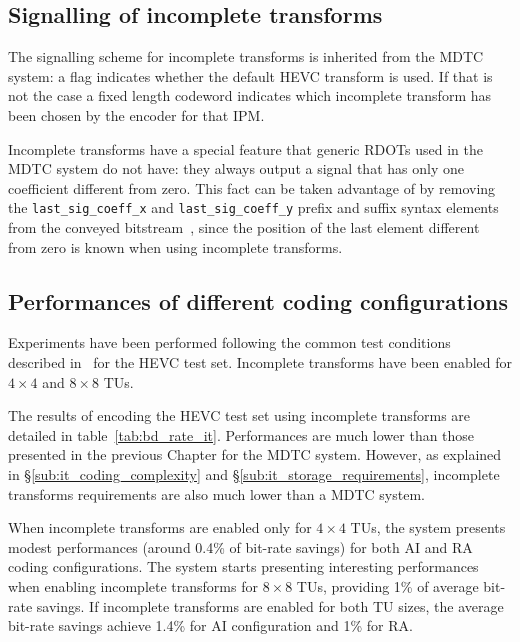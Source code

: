 \documentclass[11pt,a4paper,openright,twoside]{book}
\numberwithin{equation}{section} %
\numberwithin{figure}{section} %
\numberwithin{table}{section} %
\begin{document}
\subsection{Signalling of incomplete transforms}
\label{sub:it_signalling}

The signalling scheme for incomplete transforms is inherited from the
\ac{MDTC} system:
a flag indicates whether the default \ac{HEVC} transform is used.
If that is not the case a fixed length codeword indicates which incomplete
transform has been chosen by the encoder for that \ac{IPM}.

Incomplete transforms have a special feature that generic \acp{RDOT} used in
the \ac{MDTC} system do not have:
they always output a signal that has only one coefficient different from zero.
This fact can be taken advantage of by removing the
\texttt{last\_sig\_coeff\_x} and \texttt{last\_sig\_coeff\_y} prefix and
suffix syntax elements from the conveyed bitstream~\cite{JCTVC-G704}, since
the position of the last element different from zero is known when using
incomplete transforms.

\subsection{Performances of different coding configurations}
\label{sub:it_performances}

Experiments have been performed following the common test conditions described
in~\cite{bossen-12-common-test-conditions} for the \ac{HEVC} test set.
Incomplete transforms have been enabled for $4\times4$ and $8\times8$
\acp{TU}.

The results of encoding the \ac{HEVC} test set using incomplete transforms are
detailed in table~\ref{tab:bd_rate_it}.
Performances are much lower than those presented in the previous Chapter for
the \ac{MDTC} system.
However, as explained in \S\ref{sub:it_coding_complexity} and
\S\ref{sub:it_storage_requirements}, incomplete transforms requirements are
also much lower than a \ac{MDTC} system.

When incomplete transforms are enabled only for $4\times4$ \acp{TU}, the
system presents modest performances (around 0.4\% of bit-rate savings) for
both \ac{AI} and \ac{RA} coding configurations.
The system starts presenting interesting performances when enabling incomplete
transforms for $8\times8$ \acp{TU}, providing 1\% of average bit-rate
savings.
If incomplete transforms are enabled for both \ac{TU} sizes, the average
bit-rate savings achieve 1.4\% for \ac{AI} configuration and 1\% for \ac{RA}.
\end{document}
